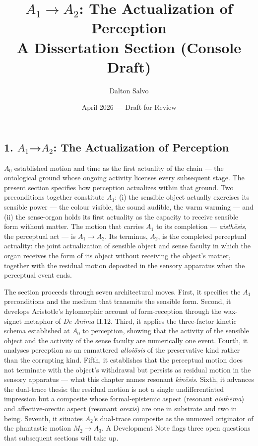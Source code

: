 \documentclass[12pt]{article}
\title{\vspace{-2em}\textbf{$A_1 \to A_2$: The Actualization of Perception}\\[0.5em]
       \large\normalfont A Dissertation Section (Console Draft)}
\author{Dalton Salvo}
\date{April 2026 — Draft for Review}
\begin{document}
\maketitle

\thispagestyle{fancy}

\subsection*{1. $A_1$→$A_2$: The Actualization of Perception}

$A_0$ established motion and time as the first actuality of the chain --- the ontological ground whose ongoing activity licenses every subsequent stage. The present section specifies how perception actualizes within that ground. Two preconditions together constitute $A_1$: (i) the sensible object actually exercises its sensible power --- the colour visible, the sound audible, the warm warming --- and (ii) the sense-organ holds its first actuality as the capacity to receive sensible form without matter. The motion that carries $A_1$ to its completion --- \textit{aisthēsis}, the perceptual act --- is $A_1$$\to$$A_2$. Its terminus, $A_2$, is the completed perceptual actuality: the joint actualization of sensible object and sense faculty in which the organ receives the form of its object without receiving the object's matter, together with the residual motion deposited in the sensory apparatus when the perceptual event ends.

The section proceeds through seven architectural moves. First, it specifies the $A_1$ preconditions and the medium that transmits the sensible form. Second, it develops Aristotle's hylomorphic account of form-reception through the wax-signet metaphor of \textit{De Anima} II.12. Third, it applies the three-factor kinetic schema established at $A_0$ to perception, showing that the activity of the sensible object and the activity of the sense faculty are numerically one event. Fourth, it analyses perception as an enmattered \textit{alloiōsis} of the preservative kind rather than the corrupting kind. Fifth, it establishes that the perceptual motion does not terminate with the object's withdrawal but persists as residual motion in the sensory apparatus --- what this chapter names resonant \textit{kinēsis}. Sixth, it advances the dual-trace thesis: the residual motion is not a single undifferentiated impression but a composite whose formal-epistemic aspect (resonant \textit{aisthēma}) and affective-orectic aspect (resonant \textit{orexis}) are one in substrate and two in being. Seventh, it situates $A_2$'s dual-trace composite as the unmoved originator of the phantastic motion $M_2$$\to$$A_3$. A Development Note flags three open questions that subsequent sections will take up.
\end{document}
